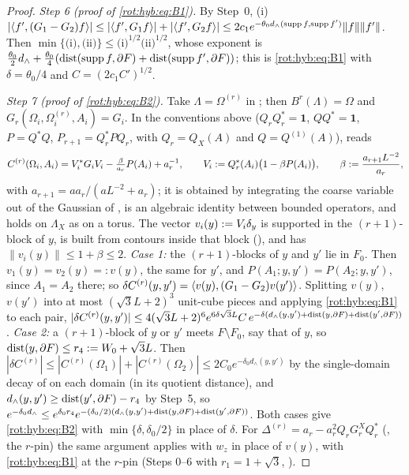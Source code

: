 \begin{proof}
\emph{Step 6 (proof of \eqref{rot:hyb:eq:B1}).} By Step~0, (i) $|\langle f',(G_1-G_2)f\rangle|\le|\langle f',G_1f\rangle|+|\langle f',G_2f\rangle|\le2c_1e^{-\theta_0d_\wedge(\operatorname{supp} f,\operatorname{supp} f')}\|f\|\|f'\|$. Then $\min\{\text{(i)},\text{(ii)}\}\le\text{(i)}^{1/2}\text{(ii)}^{1/2}$, whose exponent is $\frac{\theta_0}2d_\wedge+\frac{\theta_0}4(\operatorname{dist}(\operatorname{supp} f,\partial F)+\operatorname{dist}(\operatorname{supp} f',\partial F))$; this is \eqref{rot:hyb:eq:B1} with $\delta=\theta_0/4$ and $C=(2c_1C')^{1/2}$.

\emph{Step 7 (proof of \eqref{rot:hyb:eq:B2}).} Take $\Lambda=\Omega^{(r)}$ in \cite[(3.5)]{Ba4}; then $B^r(\Lambda)=\Omega$ and $G_r(\Omega_i,\Omega_i^{(r)},A_i)=G_i$. In the conventions above ($Q_rQ_r^*=\mathbf 1$, $QQ^*=\mathbf 1$, $P=Q^*Q$, $P_{r+1}=Q_r^*PQ_r$, with $Q_r=Q_X(A)$ and $Q=Q^{(1)}(A)$), \cite[(3.6)]{Ba4} reads
\[
C^{(r)}(\Omega_i,A_i)=V_i^*G_iV_i-\tfrac{\beta}{a_r}P(A_i)+a_r^{-1},\qquad V_i:= Q_r^*(A_i)\big(1-\beta P(A_i)\big),\qquad\beta:=\frac{a_{r+1}L^{-2}}{a_r},
\]
with $a_{r+1}=aa_r/(aL^{-2}+a_r)$; it is obtained by integrating the coarse variable out of the Gaussian of \cite[(3.1)]{Ba4}, is an algebraic identity between bounded operators, and holds on $\Lambda_X$ as on a torus. The vector $v_i(y):= V_i\delta_y$ is supported in the $(r+1)$-block of $y$, is built from contours inside that block (), and has $\|v_i(y)\|\le1+\beta\le2$.
\emph{Case 1:} the $(r+1)$-blocks of $y$ and $y'$ lie in $F_0$. Then $v_1(y)=v_2(y)=:v(y)$, the same for $y'$, and $P(A_1;y,y')=P(A_2;y,y')$, since $A_1=A_2$ there; so $\delta C^{(r)}(y,y')=\langle v(y),(G_1-G_2)v(y')\rangle$. Splitting $v(y)$, $v(y')$ into at most $(\sqrt3L+2)^3$ unit-cube pieces and applying \eqref{rot:hyb:eq:B1} to each pair, $|\delta C^{(r)}(y,y')|\le4(\sqrt3L+2)^6e^{6\delta\sqrt3L}C\,e^{-\delta(d_\wedge(y,y')+\operatorname{dist}(y,\partial F)+\operatorname{dist}(y',\partial F))}$.
\emph{Case 2:} a $(r+1)$-block of $y$ or $y'$ meets $F\setminus F_0$, say that of $y$, so $\operatorname{dist}(y,\partial F)\le r_4:= W_0+\sqrt3L$. Then $|\delta C^{(r)}|\le|C^{(r)}(\Omega_1)|+|C^{(r)}(\Omega_2)|\le2C_0e^{-\delta_0d_\wedge(y,y')}$ by the single-domain decay of  on each domain (in its quotient distance), and $d_\wedge(y,y')\ge\operatorname{dist}(y',\partial F)-r_4$ by Step~5, so $e^{-\delta_0d_\wedge}\le e^{\delta_0r_4}e^{-(\delta_0/2)(d_\wedge(y,y')+\operatorname{dist}(y,\partial F)+\operatorname{dist}(y',\partial F))}$. Both cases give \eqref{rot:hyb:eq:B2} with $\min\{\delta,\delta_0/2\}$ in place of $\delta$.
For $\Delta^{(r)}=a_r-a_r^2Q_rG^X_rQ_r^*$ (\cite[(2.14)]{K1}, the $r$-pin) the same argument applies with $w_z$ in place of $v(y)$, with \eqref{rot:hyb:eq:B1} at the $r$-pin (Steps 0--6 with $r_1=1+\sqrt3$, ).
\end{proof}

